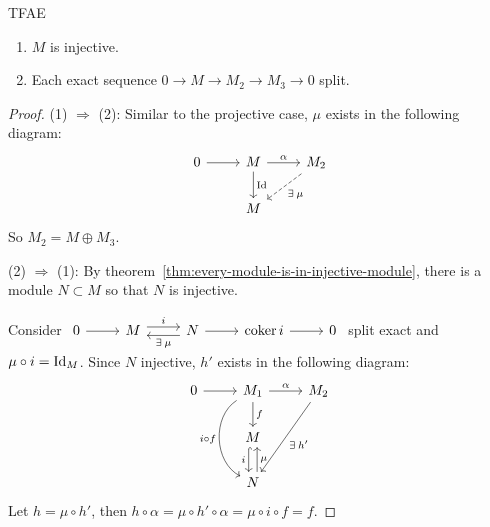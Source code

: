 \begin{prop}
  TFAE
  \begin{enumerate}
    \item $M$ is injective.
    \item Each exact sequence $0 \to M \to M_2 \to M_3 \to 0$ split.
  \end{enumerate}
  \begin{proof}
    (1) $\Rightarrow$ (2): Similar to the projective case, $\mu$ exists
    in the following diagram:
    \[
    \begin{tikzcd}
      0 \ar[r] & M \ar[r, "\alpha"] \ar[d, "\Id"] & M_2 \ar[dl, "\exists
      \mu", dashed] \\
               & M
    \end{tikzcd}
    \]
    So $M_2 = M \oplus M_3$.

    (2) $\Rightarrow$ (1):
    By theorem~\ref{thm:every-module-is-in-injective-module},
    there is a module $N \subset M$ so that $N$ is injective.

    Consider
    $
    \begin{tikzcd}
    0 \ar[r] & M \ar[r, "i", yshift=0.7ex] &  N \ar[r] \ar[l, "\exists \mu", 
      yshift=-0.7ex] & \coker i \ar[r]& 0
    \end{tikzcd}
    $
    split exact and $\mu \circ i = {\rm Id}_M$. Since $N$ injective,
    $h'$ exists in the following diagram:
    \[
    \begin{tikzcd}
      0 \ar[r] & M_1 \ar[r, "\alpha"] \ar[d , "f"] \ar[dd, "i 
      \circ f" swap, bend right = 60] & M_2 \ar[ddl, "\exists h'"]\\
               & M \ar[d, xshift=-0.7ex, "i" swap , hook] \\
               & N \ar[u, xshift=0.7ex, "\mu" swap]
    \end{tikzcd}
    \]
    Let $h = \mu \circ h'$, then $h \circ \alpha = \mu \circ h' 
    \circ \alpha = \mu \circ i \circ f = f$.
  \end{proof}
\end{prop}

